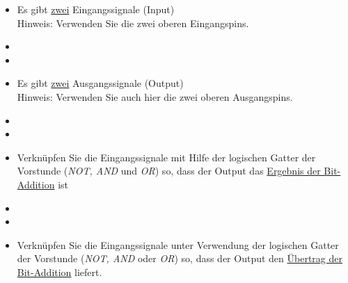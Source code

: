 \documentclass[oneside,openany,headings=optiontotoc,11pt,numbers=noenddot]{scrreprt}
\begin{document}
	\begin{itemize}
		\item Es gibt \underline{zwei} Eingangssignale (Input)\\
		\small{Hinweis: Verwenden Sie die zwei oberen Eingangspins.}\normalsize
		\\
		\item[]
		
		\item[]
		\item Es gibt \underline{zwei} Ausgangssignale (Output)\\
		\small{Hinweis: Verwenden Sie auch hier die zwei oberen Ausgangspins.}\normalsize
		\\
		\item[]
		
		\item[]
		\item Verknüpfen Sie die Eingangssignale mit Hilfe der logischen Gatter der Vorstunde (\textit{NOT, AND} und \textit{OR}) so, dass der Output das \underline{Ergebnis der Bit-Addition} ist
		\\
		\item[]
		
		\item[]
		\item Verknüpfen Sie die Eingangssignale unter Verwendung der logischen Gatter der Vorstunde (\textit{NOT, AND} oder \textit{OR}) so, dass der Output den \underline{Übertrag der Bit-Addition} liefert.
	\end{itemize}
\end{document}
